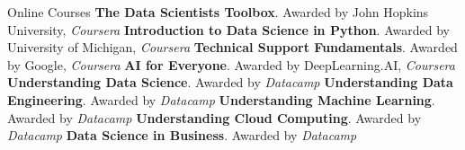 \begin{rubric}{Online Courses}
\entry*\textbf{The Data Scientists Toolbox}. Awarded by John Hopkins University, \textit{Coursera}
\entry*\textbf{Introduction to Data Science in Python}. Awarded by University of Michigan, \textit{Coursera}
\entry*\textbf{Technical Support Fundamentals}. Awarded by Google, \textit{Coursera}
\entry*\textbf{AI for Everyone}. Awarded by DeepLearning.AI, \textit{Coursera}
\entry*\textbf{Understanding Data Science}. Awarded by  \textit{Datacamp}
\entry*\textbf{Understanding Data Engineering}. Awarded by  \textit{Datacamp}
\entry*\textbf{Understanding Machine Learning}. Awarded by  \textit{Datacamp}
\entry*\textbf{Understanding Cloud Computing}. Awarded by  \textit{Datacamp}
\entry*\textbf{Data Science in Business}. Awarded by  \textit{Datacamp}
\end{rubric}